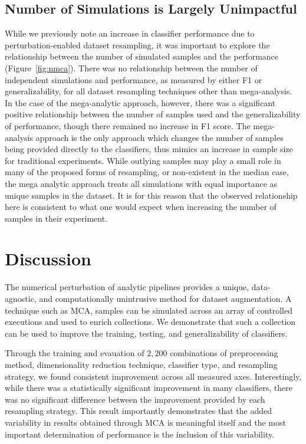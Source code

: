 \documentclass[10pt]{SelfArx} %
\begin{document}
\subsection*{Number of Simulations is Largely Unimpactful}

While we previously note an increase in classifier performance due to perturbation-enabled dataset resampling, it was
important to explore the relationship between the number of simulated samples and the performance
(Figure~\ref{fig:nmca}). There was no relationship between the number of independent simulations and performance, as
measured by either F1 or generalizability, for all dataset resampling techniques other than mega-analysis. In the case
of the mega-analytic approach, however, there was a significant positive relationship between the number of samples
used and the generalizability of performance, though there remained no increase in F1 score. The mega-analysis approach
is the only approach which changes the number of samples being provided directly to the classifiers, thus mimics an
increase in sample size for traditional experiments. While outlying samples may play a small role in many of the
proposed forms of resampling, or non-existent in the median case, the mega analytic approach treats all simulations
with equal importance as unique samples in the dataset. It is for this reason that the observed relationship here
is consistent to what one would expect when increasing the number of samples in their experiment.

\section*{Discussion}

The numerical perturbation of analytic pipelines provides a unique, data-agnostic, and computationally unintrusive
method for dataset augmentation. A technique such as MCA, samples can be simulated across an array of controlled
executions and used to enrich collections. We demonstrate that such a collection can be used to improve the training,
testing, and generalizability of classifiers.

Through the training and evauation of $2,200$ combinations of preprocessing method, dimensionality reduction technique,
classifier type, and resampling strategy, we found consistent improvement across all measured axes. Interestingly,
while there was a statistically significant improvement in many classifiers, there was no significant difference
between the improvement provided by each resampling strategy. This result importantly demonstrates that the added
variability in results obtained through MCA is meaningful itself and the most important determination of performance is
the inclusion of this variability.
\end{document}
